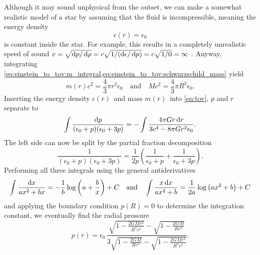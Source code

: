 Although it may sound unphysical from the outset, we can make a somewhat realistic model of a star by assuming that the fluid is incompressible, meaning the energy density
\begin{equation}
	\epsilon(r) = \epsilon_0
\end{equation}
is constant inside the star.
For example, this results in a completely unrealistic speed of sound $v = \sqrt{\mathop{}\!\mathrm{d} p / \mathop{}\!\mathrm{d} \rho} = c \sqrt{1/(\mathop{}\!\mathrm{d} \epsilon / \mathop{}\!\mathrm{d} p)} = c \sqrt{1/0} = \infty$ \cite{ref:speed_of_sound}.
Anyway, integrating \cref{eq:einstein_to_tov:m_integral,eq:einstein_to_tov:schwarzschild_mass} yield
\begin{equation}
	m(r) c^2 = \frac{4}{3} \pi r^3 \epsilon_0 
	\quad \text{and} \quad
	M c^2 = \frac{4}{3} \pi R^3 \epsilon_0 
	.
\end{equation}
Inserting the energy density $\epsilon(r)$ and mass $m(r)$ into \cref{eq:tov}, $p$ and $r$ separate to
\begin{equation*}
	\int \frac{\mathop{}\!\mathrm{d} p}{(\epsilon_0+p)(\epsilon_0+3p)} = - \int \frac{4 \pi G r \mathop{}\!\mathrm{d} r}{3 c^4 - 8\pi G r^2 \epsilon_0} .
\end{equation*}
The left side can now be split by the partial fraction decomposition
\begin{equation*}
	\frac{1}{(\epsilon_0+p)(\epsilon_0+3p)} = \frac{1}{2p} \left( \frac{1}{\epsilon_0+p} + \frac{1}{\epsilon_0+3p} \right) .
\end{equation*}
Performing all three integrals using the general antiderivatives
\begin{equation*}
	\int \frac{\mathop{}\!\mathrm{d} x}{a x^2 + b x} = -\frac{1}{b} \log \left( a + \frac{b}{x} \right) + C
	\quad \text{and} \quad
	\int \frac{x \mathop{}\!\mathrm{d} x}{a x^2 + b} = \frac{1}{2 a} \log \left( a x^2 + b \right) + C
\end{equation*}
and applying the boundary condition $p(R) = 0$ to determine the integration constant, we eventually find the radial pressure
\begin{equation}
	p(r) = \epsilon_0 \, \frac{\sqrt{1-\frac{2GMr^2}{R^3c^2}} - \sqrt{1-\frac{2GM}{Rc^2}}}{3 \sqrt{1-\frac{2GM}{Rc^2}} - \sqrt{1-\frac{2GMr^2}{R^3c^2}}} .
	\label{eq:incompressible_star:pressure}
\end{equation}
